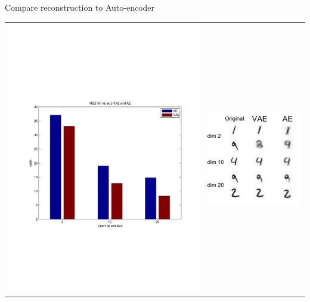 \documentclass[landscape,a0b,final,a4resizeable]{include/a0poster}
\begin{document}
\begin{poster}
\begin{multicols}{3}
Compare reconstruction to Auto-encoder\\
\begin{tabular}{cc}
\begin{minipage}[c]{0.5\columnwidth}
\hspace{0em}
\includegraphics[width=0.8\columnwidth]{../res/mnist_mse.pdf}
\end{minipage} & 
\begin{minipage}[c]{0.5\columnwidth}
\begin{center}
\vspace{1.0cm}
\includegraphics[width=.9\columnwidth]{../res/recon_mnist_compre.pdf}

\end{center}
\end{minipage}
\end{tabular}
\end{multicols}
\end{poster}
\end{document}
